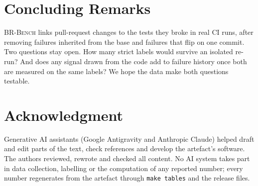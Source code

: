 \documentclass[10pt,conference]{IEEEtran}
\begin{document}
\section{Concluding Remarks}

\textsc{BR-Bench} links pull-request changes to the tests they broke in real CI runs, after removing failures inherited from the base and failures that flip on one commit. Two questions stay open. How many strict labels would survive an isolated re-run? And does any signal drawn from the code add to failure history once both are measured on the same labels? We hope the data make both questions testable.

\section*{Acknowledgment}
Generative AI assistants (Google Antigravity and Anthropic Claude) helped draft and edit parts of the text, check references and develop the artefact's software. The authors reviewed, rewrote and checked all content. No AI system takes part in data collection, labelling or the computation of any reported number; every number regenerates from the artefact through \texttt{make tables} and the release files.

\clearpage
\balance


\end{document}
